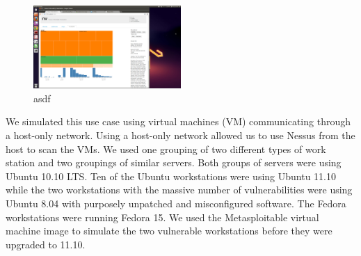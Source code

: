 \documentclass{acm_proc_article-sp}
\begin{document}
\begin{figure}
  \centering
  \includegraphics[width=0.5\textwidth]{../screenshots/final/SimDiffGroup}
  \caption{asdf}
\end{figure}

We simulated this use case using virtual machines (VM) communicating through a host-only
network. Using a host-only network allowed us to use Nessus from the host
to scan the VMs. We used one grouping of two different types of work station
and two groupings of similar servers. Both groups of servers were using Ubuntu 10.10 LTS.
Ten of the Ubuntu workstations were using Ubuntu 11.10 while the two workstations
with the massive number of vulnerabilities were using Ubuntu 8.04 with
purposely unpatched and misconfigured software.
The Fedora workstations were running Fedora 15.  We used the Metasploitable
virtual machine image to simulate the two vulnerable workstations before they
were upgraded to 11.10.
\end{document}
